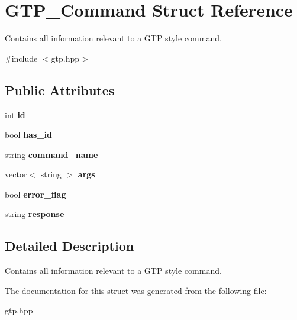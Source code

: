 \hypertarget{struct_g_t_p___command}{\section{G\-T\-P\-\_\-\-Command Struct Reference}
\label{struct_g_t_p___command}
}


Contains all information relevant to a G\-T\-P style command.  




{\ttfamily \#include $<$gtp.\-hpp$>$}

\subsection*{Public Attributes}
\begin{DoxyCompactItemize}
\item 
\hypertarget{struct_g_t_p___command_a5410c5b4d614d21b4e910cf8ce50b778}{int {\bfseries id}}\label{struct_g_t_p___command_a5410c5b4d614d21b4e910cf8ce50b778}

\item 
\hypertarget{struct_g_t_p___command_ad7d24217f992437900c4b4d59a4edb6d}{bool {\bfseries has\-\_\-id}}\label{struct_g_t_p___command_ad7d24217f992437900c4b4d59a4edb6d}

\item 
\hypertarget{struct_g_t_p___command_abc8973d71330adb1deb20c20c6233a63}{string {\bfseries command\-\_\-name}}\label{struct_g_t_p___command_abc8973d71330adb1deb20c20c6233a63}

\item 
\hypertarget{struct_g_t_p___command_a7099195267ede90e7fbc8c285a54d9d4}{vector$<$ string $>$ {\bfseries args}}\label{struct_g_t_p___command_a7099195267ede90e7fbc8c285a54d9d4}

\item 
\hypertarget{struct_g_t_p___command_a77e56c8aca4528de8c4f9ead5a4a9383}{bool {\bfseries error\-\_\-flag}}\label{struct_g_t_p___command_a77e56c8aca4528de8c4f9ead5a4a9383}

\item 
\hypertarget{struct_g_t_p___command_a9a69b54f08c7a0f425767652902463bb}{string {\bfseries response}}\label{struct_g_t_p___command_a9a69b54f08c7a0f425767652902463bb}

\end{DoxyCompactItemize}


\subsection{Detailed Description}
Contains all information relevant to a G\-T\-P style command. 

The documentation for this struct was generated from the following file\-:\begin{DoxyCompactItemize}
\item 
gtp.\-hpp\end{DoxyCompactItemize}
